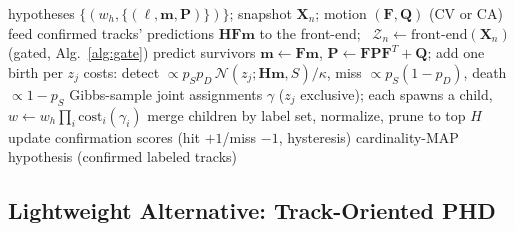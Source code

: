 \documentclass[journal]{IEEEtran}
\newcommand{\mat}[1]{\mathbf{#1}}
\begin{document}
\begin{algorithm}[t]
\caption{Physics-based $\delta$-GLMB back-end (one closed-loop scan)}
\label{alg:glmb}
\begin{algorithmic}[1]
\REQUIRE hypotheses $\{(w_h,\{(\ell,\mat{m},\mat{P})\})\}$; snapshot $\mat{X}_n$; motion $(\mat{F},\mat{Q})$ (CV or CA)
\STATE feed confirmed tracks' predictions $\mat{H}\mat{F}\mat{m}$ to the front-end; \ $\mathcal{Z}_n \leftarrow \mathrm{front\text{-}end}(\mat{X}_n)$ (gated, Alg.~\ref{alg:gate})
    \STATE predict survivors $\mat{m}\!\leftarrow\!\mat{F}\mat{m}$, $\mat{P}\!\leftarrow\!\mat{F}\mat{P}\mat{F}^T\!+\!\mat{Q}$; add one birth per $z_j$
    \STATE costs: detect $\propto p_S p_D\,\mathcal{N}(z_j;\mat{H}\mat{m},S)/\kappa$, miss $\propto p_S(1{-}p_D)$, death $\propto 1{-}p_S$
    \STATE Gibbs-sample joint assignments $\gamma$ ($z_j$ exclusive); each spawns a child, $w\!\leftarrow\! w_h\!\prod_i \mathrm{cost}_i(\gamma_i)$
\ENDFOR
\STATE merge children by label set, normalize, prune to top $H$
\STATE update confirmation scores (hit $+1$/miss $-1$, hysteresis)
\RETURN cardinality-MAP hypothesis (confirmed labeled tracks)
\end{algorithmic}
\end{algorithm}

\subsection{Lightweight Alternative: Track-Oriented PHD}
\end{document}

